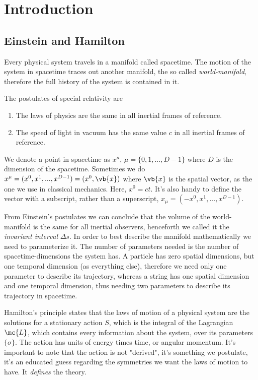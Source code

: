 \documentclass[oneside, 12pt]{book}
\begin{document}
\chapter{Introduction}

\section{Einstein and Hamilton}

Every physical system travels in a manifold called spacetime. The motion of the system in spacetime traces out another manifold, the so called \textit{world-manifold}, therefore the full history of the system is contained in it. \par

The postulates of special relativity are
\begin{enumerate}
    \item The laws of physics are the same in all inertial frames of reference.
    \item The speed of light in vacuum has the same value \(c\) in all inertial frames of reference.
\end{enumerate}
We denote a point in spacetime as \( x^{\mu}\), \(\mu = \{0,1,...,D-1\} \) where \(D\) is the dimension of the spacetime. Sometimes we do \( x^{\mu } = (x^0,x^1,...,x^{D-1}) = (x^0,\vb{x})\) where \(\vb{x}\) is the spatial vector, as the one we use in classical mechanics. Here, \( x^0 = ct\). It's also handy to define the vector with a subscript, rather than a superscript, \( x_{\mu} = (- x^0,x^1,...,x^{D-1})\).\par 

From Einstein's postulates we can conclude that the volume of the world-manifold is the same for all inertial observers, henceforth we called it the \textit{invariant interval} \(\Delta s \). In order to best describe the manifold mathematically we need to parameterize it. The number of parameters needed is the number of spacetime-dimensions the system has. A particle has zero spatial dimensions, but one temporal dimension (as everything else), therefore we need only one parameter to describe its trajectory, whereas a string has one spatial dimension and one temporal dimension, thus needing two parameters to describe its trajectory in spacetime.\par 

Hamilton's principle states that the laws of motion of a physical system are the solutions for a stationary action \(S\), which is the integral of the Lagrangian \(\mc{L}\), which contains every information about the system, over its parameters \(\{\sigma\}\). The action has units of energy times time, or angular momentum. It's important to note that the action is not "derived", it's something we postulate, it's an educated guess regarding the symmetries we want the laws of motion to have. It \textit{defines} the theory.\par
\end{document}
